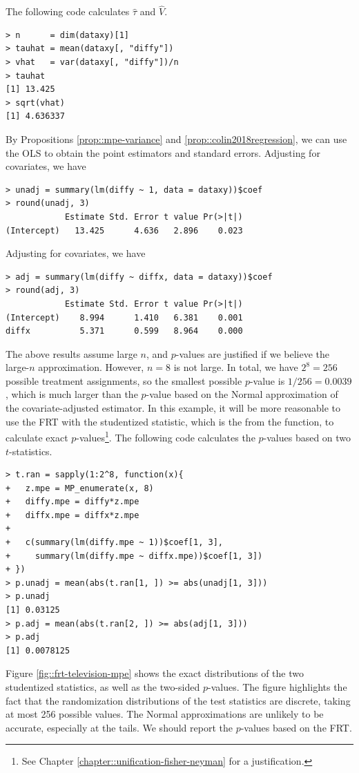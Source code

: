 The following  code calculates $\hat\tau$ and $\hat V$. 
\begin{lstlisting}
> n      = dim(dataxy)[1]
> tauhat = mean(dataxy[, "diffy"])
> vhat   = var(dataxy[, "diffy"])/n
> tauhat
[1] 13.425
> sqrt(vhat)
[1] 4.636337
\end{lstlisting}
By Propositions \ref{prop::mpe-variance} and \ref{prop::colin2018regression},  we can  use the OLS to obtain the point estimators  and standard errors. Adjusting for covariates, we have
\begin{lstlisting}
> unadj = summary(lm(diffy ~ 1, data = dataxy))$coef
> round(unadj, 3) 
            Estimate Std. Error t value Pr(>|t|)
(Intercept)   13.425      4.636   2.896    0.023
\end{lstlisting}
Adjusting for covariates, we have
\begin{lstlisting} 
> adj = summary(lm(diffy ~ diffx, data = dataxy))$coef
> round(adj, 3)
            Estimate Std. Error t value Pr(>|t|)
(Intercept)    8.994      1.410   6.381    0.001
diffx          5.371      0.599   8.964    0.000
\end{lstlisting}


The above results assume large $n$, and $p$-values are justified if we believe the large-$n$ approximation. However, $n=8$ is not large. In total, we have $2^8 = 256$ possible treatment assignments, so the smallest possible $p$-value is $1/256 = 0.0039$, which is much larger than the $p$-value based on the Normal approximation of the covariate-adjusted estimator. In this example, it will be more reasonable to use the FRT with the studentized statistic, which is the  from the  function, to calculate exact $p$-values\footnote{See Chapter \ref{chapter::unification-fisher-neyman} for a justification.}. The following  code calculates the $p$-values based on two $t$-statistics. 
\begin{lstlisting} 
> t.ran = sapply(1:2^8, function(x){ 
+   z.mpe = MP_enumerate(x, 8)
+   diffy.mpe = diffy*z.mpe
+   diffx.mpe = diffx*z.mpe
+   
+   c(summary(lm(diffy.mpe ~ 1))$coef[1, 3],
+     summary(lm(diffy.mpe ~ diffx.mpe))$coef[1, 3]) 
+ })
> p.unadj = mean(abs(t.ran[1, ]) >= abs(unadj[1, 3]))
> p.unadj
[1] 0.03125
> p.adj = mean(abs(t.ran[2, ]) >= abs(adj[1, 3]))
> p.adj
[1] 0.0078125
\end{lstlisting}


Figure \ref{fig::frt-television-mpe} shows the exact distributions of the two studentized statistics, as well as the two-sided $p$-values. The figure highlights the fact that the randomization distributions of the test statistics are discrete, taking at most 256 possible values. The Normal approximations are unlikely to be accurate, especially at the tails. We should report the $p$-values based on the FRT. 


